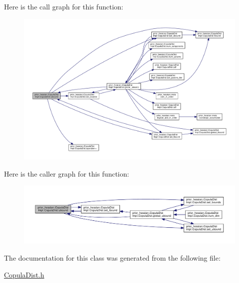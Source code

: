 Here is the call graph for this function\+:\nopagebreak
\begin{figure}[H]
\begin{center}
\leavevmode
\includegraphics[width=350pt]{classprior__hessian_1_1CopulaDistImpl_1_1CopulaDist_abdb39f0c5f7f5f4b16bf501e6083d5b6_cgraph}
\end{center}
\end{figure}




Here is the caller graph for this function\+:\nopagebreak
\begin{figure}[H]
\begin{center}
\leavevmode
\includegraphics[width=350pt]{classprior__hessian_1_1CopulaDistImpl_1_1CopulaDist_abdb39f0c5f7f5f4b16bf501e6083d5b6_icgraph}
\end{center}
\end{figure}




The documentation for this class was generated from the following file\+:\begin{DoxyCompactItemize}
\item 
\hyperlink{CopulaDist_8h}{Copula\+Dist.\+h}\end{DoxyCompactItemize}

